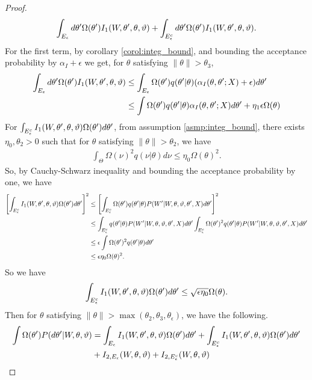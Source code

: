 \begin{proof}
$$\int_{E_\epsilon} d\theta' \Omega(\theta') I_1(W, \theta', \theta, \vartheta) +
\int_{E_\epsilon^c} d\theta' \Omega(\theta') I_1(W, \theta', \theta, \vartheta).
  $$
For the first term, by corollary \ref{corol:integ_bound}, and bounding
the acceptance probability by $\alpha_I + \epsilon$ we get, for $\theta$ satisfying $ \| \theta \| > \theta_3$,
\begin{align*}
\int_{E_\epsilon} d\theta' \Omega(\theta') I_1(W, \theta', \theta, \vartheta)  &
 \leq \int_{E_\epsilon} \Omega(\theta')q(\theta' | \theta) (\alpha_I(\theta, \theta'; X) + \epsilon) d\theta' \\
& \leq \int \Omega(\theta')q(\theta' | \theta) \alpha_I(\theta, \theta'; X) d\theta' + \eta_1 \epsilon \Omega(\theta)
\end{align*}
For $\int_{E_\epsilon^c} I_1(W, \theta', \theta, \vartheta) \Omega(\theta') d\theta'$, from assumption \ref{asmp:integ_bound}, there exists $\eta_0 , \theta_2 > 0$ such that for $\theta$ satisfying $ \| \theta \| > \theta_2$, we have
\begin{align*}
\int_\Theta \Omega(\nu)^2 q(\nu | \theta)d\nu \leq \eta_0 \Omega(\theta)^2.
\end{align*}
So, by Cauchy-Schwarz inequality and bounding the acceptance probability by one, we have
\begin{align*}
\left[  \int_{E_\epsilon^c} I_1(W, \theta', \theta, \vartheta) \Omega(\theta') d\theta'  \right]^2 &\le \left[  \int_{E_\epsilon^c}  \Omega(\theta') q(\theta' | \theta) P(W' | W, \theta, \vartheta, \theta', X)d\theta' \right]^2\\
& \le \int_{E_\epsilon^c} q(\theta' | \theta) P(W' |W, \theta, \vartheta, \theta', X)d\theta'  \int_{E_\epsilon^c}  \Omega(\theta')^2 q(\theta' | \theta) P(W' |W, \theta, \vartheta, \theta', X)d\theta'   \\
& \le \epsilon \int  \Omega(\theta')^2 q(\theta' | \theta)d\theta' \\
& \le \epsilon \eta_0 \Omega(\theta)^2 .
\end{align*}
So we have
\begin{align*}
\int_{E_\epsilon^c} I_1(W, \theta', \theta, \vartheta) \Omega(\theta') d\theta' \le \sqrt{\epsilon \eta_0 }\Omega(\theta) .
\end{align*}
Then for $\theta$ satisfying $ \| \theta \| >\max(\theta_2, \theta_3, \theta_\epsilon)$, we have the following.
\begin{align*}
  \int \Omega(\theta') P(d\theta'| W, \theta, \vartheta)
  &= \int_{\E_\epsilon} I_1(W, \theta', \theta, \vartheta) \Omega(\theta') d\theta' + \int_{\E_\epsilon^c} I_1(W, \theta', \theta, \vartheta) \Omega(\theta') d\theta' \\ &+ I_{2,\E_{\epsilon}}(W, \theta, \vartheta) + I_{2,\E_{\epsilon}^c}(W, \theta, \vartheta) \\

\end{align*}
\end{proof}

